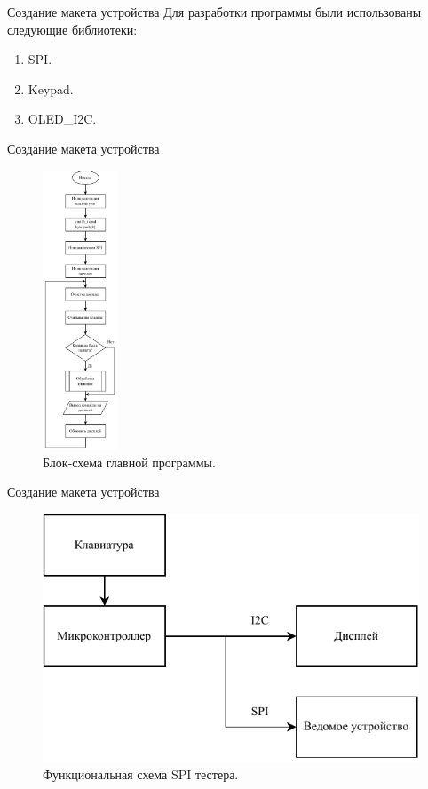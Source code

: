 \documentclass[10pt]{beamer}
\begin{document}
\begin{frame}{Создание макета устройства}
Для разработки программы были использованы следующие библиотеки:
  \begin{enumerate}
  \item SPI.
  \item Keypad.
  \item OLED\_I2C.
  \end{enumerate}
\end{frame}

\begin{frame}{Создание макета устройства}
  \begin{figure}
  \includegraphics[width=0.2\textwidth]{main}
  \caption{Блок-схема главной программы.}
  \end{figure}
\end{frame}

\begin{frame}{Создание макета устройства}
  \begin{figure}
 	 \includegraphics[width=1\textwidth]{scheme}
 	 \caption{Функциональная схема SPI тестера.}
  \end{figure}
\end{frame}
\end{document}
